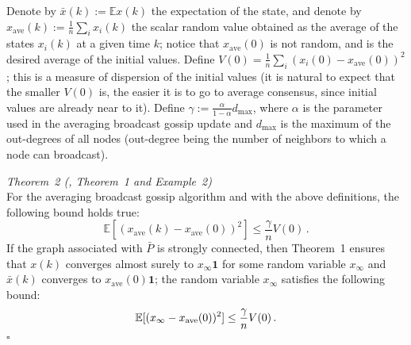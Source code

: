 \documentclass{article}
\begin{document}
	 Denote by $\bar x(k) :=  \mathbb E x(k)$ the expectation of the state, and denote by $x_{\text{ave}}(k) := \frac{1}{n}\sum_i x_i(k)$ the scalar random value obtained as the average of the states $x_i(k)$ at a given time $k$; notice that $x_{\text{ave}}(0)$ is not random, and is the desired average of the initial values.
	 Define $V(0) = \frac{1}{n} \sum_i (x_i(0) - x_{\text{ave}}(0))^2 $; this is a measure of dispersion of the initial values (it is natural to expect that the smaller $V(0)$ is, the easier it is to go to average consensus, since initial values are already near to it). Define $\gamma:= \frac{\alpha}{1-\alpha} d_{\max}$,
	 where $\alpha$ is the parameter used in the averaging broadcast gossip update and $d_{\max}$ is the maximum of the out-degrees of all nodes (out-degree being the number of neighbors to which a node can broadcast).

	\textit{Theorem~2 (\cite{gossip-small-error}, Theorem~1 and Example~2)}\\
For the averaging broadcast gossip algorithm and with the above definitions, the following bound holds true:
\[ \mathbb E [ (x_{\text{ave}}(k) - x_{\text{ave}}(0))^2 ] \le
 \frac{\gamma}{n} V(0)  \, .\]
If the graph associated with $\bar P$ is strongly connected, then Theorem~1 ensures that
$x(k)$ converges almost surely to $x_{\infty} \mathbf 1$ for some random variable $x_{\infty}$ and $\bar x(k)$ converges to $x_{\text{ave}}(0) \mathbf 1$;  the random variable $x_{\infty}$ satisfies the following bound:
\[ \mathbb E [ (x_{\infty} - x_{\text{ave}}(0))^2 ] \le
\frac{\gamma}{n} V(0)\,. \vspace{-2mm}\]
\hfill $\square$
%
%
\end{document}
